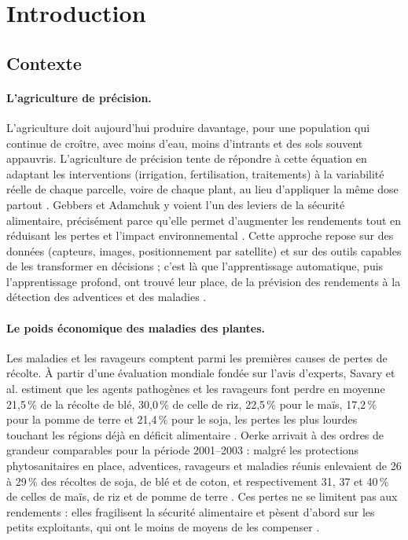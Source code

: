 \section{Introduction}
\label{sec:introduction}

\subsection{Contexte}

\paragraph{L'agriculture de précision.} L'agriculture doit aujourd'hui produire davantage, pour une population qui continue de croître, avec moins d'eau, moins d'intrants et des sols souvent appauvris. L'agriculture de précision tente de répondre à cette équation en adaptant les interventions (irrigation, fertilisation, traitements) à la variabilité réelle de chaque parcelle, voire de chaque plant, au lieu d'appliquer la même dose partout \cite{zhang2002precision}. Gebbers et Adamchuk y voient l'un des leviers de la sécurité alimentaire, précisément parce qu'elle permet d'augmenter les rendements tout en réduisant les pertes et l'impact environnemental \cite{gebbers2010precision}. Cette approche repose sur des données (capteurs, images, positionnement par satellite) et sur des outils capables de les transformer en décisions ; c'est là que l'apprentissage automatique, puis l'apprentissage profond, ont trouvé leur place, de la prévision des rendements à la détection des adventices et des maladies \cite{liakos2018ml, kamilaris2018dl}.

\paragraph{Le poids économique des maladies des plantes.} Les maladies et les ravageurs comptent parmi les premières causes de pertes de récolte. À partir d'une évaluation mondiale fondée sur l'avis d'experts, Savary et al. estiment que les agents pathogènes et les ravageurs font perdre en moyenne 21,5\,\% de la récolte de blé, 30,0\,\% de celle de riz, 22,5\,\% pour le maïs, 17,2\,\% pour la pomme de terre et 21,4\,\% pour le soja, les pertes les plus lourdes touchant les régions déjà en déficit alimentaire \cite{savary2019burden}. Oerke arrivait à des ordres de grandeur comparables pour la période 2001--2003 : malgré les protections phytosanitaires en place, adventices, ravageurs et maladies réunis enlevaient de 26 à 29\,\% des récoltes de soja, de blé et de coton, et respectivement 31, 37 et 40\,\% de celles de maïs, de riz et de pomme de terre \cite{oerke2006crop}. Ces pertes ne se limitent pas aux rendements : elles fragilisent la sécurité alimentaire et pèsent d'abord sur les petits exploitants, qui ont le moins de moyens de les compenser \cite{strange2005plant}.

